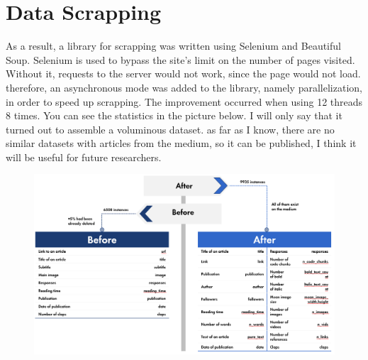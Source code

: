 \documentclass[12pt]{report}
\begin{document}
\section{Data Scrapping}
As a result, a library for scrapping was written using Selenium and Beautiful Soup. Selenium is used to bypass the site's limit on the number of pages visited. Without it, requests to the server would not work, since the page would not load. therefore, an asynchronous mode was added to the library, namely parallelization, in order to speed up scrapping. The improvement occurred when using 12 threads 8 times.
You can see the statistics in the picture below. I will only say that it turned out to assemble a voluminous dataset. as far as I know, there are no similar datasets with articles from the medium, so it can be published, I think it will be useful for future researchers.
\begin{figure}[H]
    \centering
    \includegraphics[scale=1]{./scrapping.png}
\end{figure}
\end{document}
